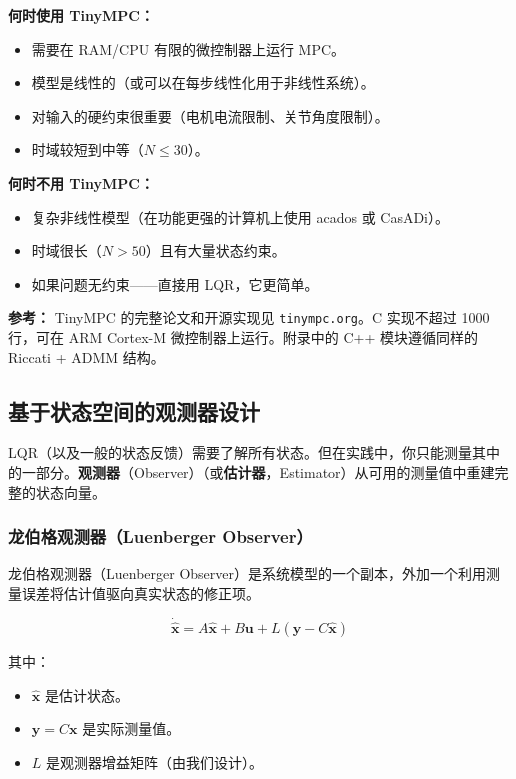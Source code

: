 \textbf{何时使用 TinyMPC：}
\begin{itemize}
    \item 需要在 RAM/CPU 有限的微控制器上运行 MPC。
    \item 模型是线性的（或可以在每步线性化用于非线性系统）。
    \item 对输入的硬约束很重要（电机电流限制、关节角度限制）。
    \item 时域较短到中等（$N \leq 30$）。
\end{itemize}

\textbf{何时不用 TinyMPC：}
\begin{itemize}
    \item 复杂非线性模型（在功能更强的计算机上使用 acados 或 CasADi）。
    \item 时域很长（$N > 50$）且有大量状态约束。
    \item 如果问题无约束——直接用 LQR，它更简单。
\end{itemize}

\textbf{参考：} TinyMPC 的完整论文和开源实现见 \texttt{tinympc.org}。C 实现不超过 1000 行，可在 ARM Cortex-M 微控制器上运行。附录中的 C++ 模块遵循同样的 Riccati + ADMM 结构。

\subsection{基于状态空间的观测器设计}

LQR（以及一般的状态反馈）需要了解所有状态。但在实践中，你只能测量其中的一部分。\textbf{观测器}（Observer）（或\textbf{估计器}，Estimator）从可用的测量值中重建完整的状态向量。

\subsubsection{龙伯格观测器（Luenberger Observer）}

龙伯格观测器（Luenberger Observer）是系统模型的一个副本，外加一个利用测量误差将估计值驱向真实状态的修正项。

\begin{equation}
\dot{\hat{\mathbf{x}}} = A\hat{\mathbf{x}} + B\mathbf{u} + L(\mathbf{y} - C\hat{\mathbf{x}})
\end{equation}

其中：
\begin{itemize}[nosep]
    \item $\hat{\mathbf{x}}$ 是估计状态。
    \item $\mathbf{y} = C\mathbf{x}$ 是实际测量值。
    \item $L$ 是观测器增益矩阵（由我们设计）。
\end{itemize}

